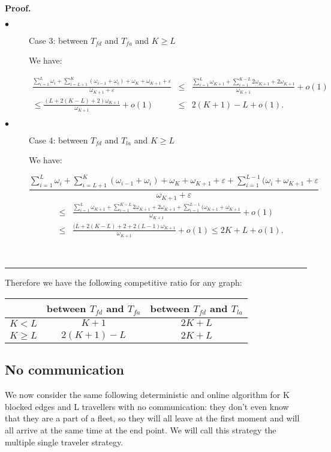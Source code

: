 \documentclass[letter-size, 11pt]{article}
\newenvironment{proof}[1][Proof]{\textbf{#1.} }{\ \rule{0.5em}{0.5em}}
\begin{document}
\begin{proof}
\begin{description}
\item[$\bullet$] Case 3: between $T_{fd}$ and $T_{fa}$ and $K \geq L$

We have: 

\begin{eqnarray}
\frac {\sum_{i=1}^{L} \omega_{i} + \sum_{i=L+1}^{K}(\omega_{i-1} + \omega_{i} ) + \omega_{K} + \omega_{K+1} + \varepsilon} {\omega_{K+1} + \varepsilon} 
&\leq& \frac {\sum_{i=1}^{L} \omega_{K+1} + \sum_{i=1}^{K-L}2\omega_{K+1} + 2\omega_{K+1}}{\omega_{K+1}} + o(1) \nonumber\\
\leq \frac {(L + 2(K - L) + 2)\omega_{K+1}}{\omega_{K+1}} + o(1)
&\leq& 2(K + 1 ) - L + o(1).\nonumber
\end{eqnarray}

\item[$\bullet$] Case 4: between $T_{fd}$ and $T_{la}$ and $K \geq L$

We have:

\[
\frac {\sum_{i=1}^{L} \omega_{i} + \sum_{i=L+1}^{K}(\omega_{i-1} + \omega_{i} ) + \omega_{K} + \omega_{K+1} + \varepsilon + \sum_{i=1}^{L-1}(\omega_{i} + \omega_{K+1} + \varepsilon } {\omega_{K+1} + \varepsilon} 
\]
\begin{eqnarray}
&\leq& \frac {\sum_{i=1}^{L} \omega_{K+1} + \sum_{i=1}^{K-L}2\omega_{K+1} + 2\omega_{K+1} + \sum_{i=1}^{L-1}(\omega_{K+1} + \omega_{K+1}} {\omega_{K+1}} + o(1) \nonumber\\
&\leq& \frac {(L + 2(K - L) + 2 + 2(L-1)\omega_{K+1}}{\omega_{K+1}} + o(1)
 \leq 2K + L + o(1).\nonumber
\end{eqnarray}

\end{description}
\end{proof}

Therefore we have the following competitive ratio for any graph:

\begin{center}
\begin{tabular}{|c|c|c|}
\hline
 & between $T_{fd}$ and $T_{fa}$  & between $T_{fd}$ and $ T_{la}$ \\ 
\hline
 ${K<L}$  & ${K + 1}$ & ${ 2K + L}$   \\ 
\hline
 ${K \geq L}$  & ${2(K+1) - L}$ & ${2K + L}$   \\ 
\hline
\end{tabular}
\end{center}

\subsection{No communication}
We now consider the same following deterministic and online algorithm for K blocked edges and L travellers with no communication: they don't even know that they are a part of a fleet, so they will all leave at the first moment and will all arrive at the same time at the end point. We will call this strategy the multiple single traveler strategy.
\end{document}
